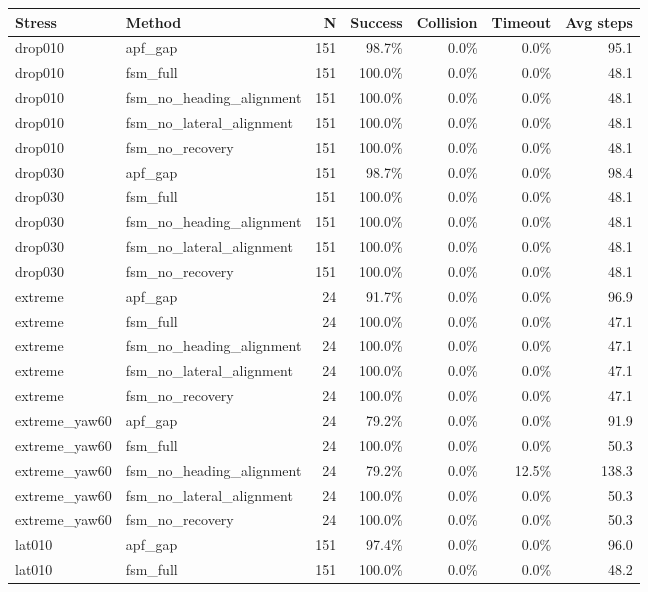 \begin{tabular}{llrrrrr}
\toprule
Stress & Method & N & Success & Collision & Timeout & Avg steps \\
\midrule
drop010 & apf\_gap & 151 & 98.7\% & 0.0\% & 0.0\% & 95.1 \\
drop010 & fsm\_full & 151 & 100.0\% & 0.0\% & 0.0\% & 48.1 \\
drop010 & fsm\_no\_heading\_alignment & 151 & 100.0\% & 0.0\% & 0.0\% & 48.1 \\
drop010 & fsm\_no\_lateral\_alignment & 151 & 100.0\% & 0.0\% & 0.0\% & 48.1 \\
drop010 & fsm\_no\_recovery & 151 & 100.0\% & 0.0\% & 0.0\% & 48.1 \\
drop030 & apf\_gap & 151 & 98.7\% & 0.0\% & 0.0\% & 98.4 \\
drop030 & fsm\_full & 151 & 100.0\% & 0.0\% & 0.0\% & 48.1 \\
drop030 & fsm\_no\_heading\_alignment & 151 & 100.0\% & 0.0\% & 0.0\% & 48.1 \\
drop030 & fsm\_no\_lateral\_alignment & 151 & 100.0\% & 0.0\% & 0.0\% & 48.1 \\
drop030 & fsm\_no\_recovery & 151 & 100.0\% & 0.0\% & 0.0\% & 48.1 \\
extreme & apf\_gap & 24 & 91.7\% & 0.0\% & 0.0\% & 96.9 \\
extreme & fsm\_full & 24 & 100.0\% & 0.0\% & 0.0\% & 47.1 \\
extreme & fsm\_no\_heading\_alignment & 24 & 100.0\% & 0.0\% & 0.0\% & 47.1 \\
extreme & fsm\_no\_lateral\_alignment & 24 & 100.0\% & 0.0\% & 0.0\% & 47.1 \\
extreme & fsm\_no\_recovery & 24 & 100.0\% & 0.0\% & 0.0\% & 47.1 \\
extreme\_yaw60 & apf\_gap & 24 & 79.2\% & 0.0\% & 0.0\% & 91.9 \\
extreme\_yaw60 & fsm\_full & 24 & 100.0\% & 0.0\% & 0.0\% & 50.3 \\
extreme\_yaw60 & fsm\_no\_heading\_alignment & 24 & 79.2\% & 0.0\% & 12.5\% & 138.3 \\
extreme\_yaw60 & fsm\_no\_lateral\_alignment & 24 & 100.0\% & 0.0\% & 0.0\% & 50.3 \\
extreme\_yaw60 & fsm\_no\_recovery & 24 & 100.0\% & 0.0\% & 0.0\% & 50.3 \\
lat010 & apf\_gap & 151 & 97.4\% & 0.0\% & 0.0\% & 96.0 \\
lat010 & fsm\_full & 151 & 100.0\% & 0.0\% & 0.0\% & 48.2 \\

\end{tabular}

